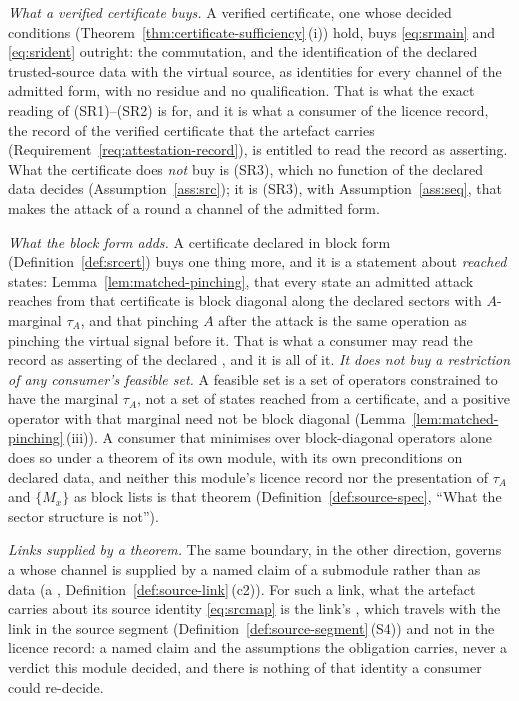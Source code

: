 \begin{remark}
\emph{What a verified certificate buys.} A verified certificate, one whose
decided conditions (Theorem~\ref{thm:certificate-sufficiency}\,(i)) hold, buys
\eqref{eq:srmain} and \eqref{eq:srident} outright: the commutation, and the
identification of the declared trusted-source data with the virtual source,
as identities for every channel of the admitted form, with no residue and no
qualification. That is what the exact reading of (SR1)--(SR2) is for, and it
is what a consumer of the licence record, the record of the verified
certificate that the artefact carries (Requirement~\ref{req:attestation-record}),
is entitled to read the record as asserting. What the certificate does
\emph{not} buy is (SR3), which no function of the declared data decides
(Assumption~\ref{ass:src}); it is (SR3), with Assumption~\ref{ass:seq}, that
makes the attack of a round a channel of the admitted form.

\emph{What the block form adds.} A certificate declared in block form
(Definition~\ref{def:srcert}) buys one thing more, and it is a statement about
\emph{reached} states: Lemma~\ref{lem:matched-pinching}, that every state an
admitted attack reaches from that certificate is block diagonal along the
declared sectors with $A$-marginal $\tau_A$, and that pinching $A$ after the
attack is the same operation as pinching the virtual signal before it. That is
what a consumer may read the record as asserting of the declared , and it is all of it. \emph{It does not buy a restriction of any
consumer's feasible set.} A feasible set is a set of operators constrained to
have the marginal $\tau_A$, not a set of states reached from a certificate,
and a positive operator with that marginal need not be block diagonal
(Lemma~\ref{lem:matched-pinching}\,(iii)). A consumer that minimises over
block-diagonal operators alone does so under a theorem of its own module, with
its own preconditions on declared data, and neither this module's licence
record nor the presentation of $\tau_A$ and $\{M_x\}$ as block lists is that
theorem (Definition~\ref{def:source-spec}, ``What the sector structure is
not'').

\emph{Links supplied by a theorem.} The same boundary, in the other
direction, governs a  whose channel is supplied by a named claim
of a submodule rather than as data (a ,
Definition~\ref{def:source-link}\,(c2)). For such a link, what the artefact
carries about its source identity \eqref{eq:srcmap} is the link's , which travels with the link in the source segment
(Definition~\ref{def:source-segment}\,(S4)) and not in the licence record: a
named claim and the assumptions the obligation carries, never a verdict this
module decided, and there is nothing of that identity a consumer could
re-decide.
\end{remark}
